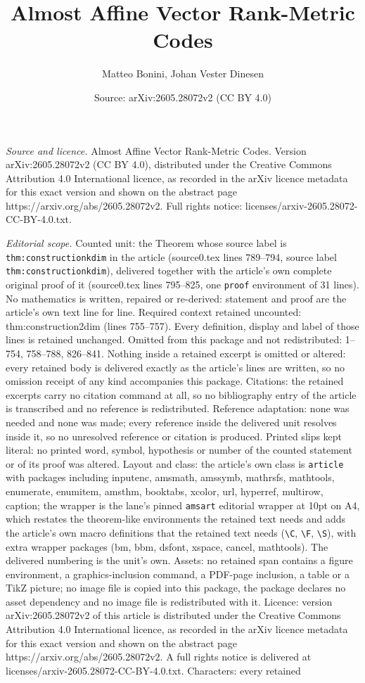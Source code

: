 \documentclass[10pt,a4paper]{amsart}
\title[Almost Affine Vector Rank-Metric Codes]{Almost Affine Vector Rank-Metric Codes}
\author{Matteo Bonini, Johan Vester Dinesen}
\date{Source: arXiv:2605.28072v2 (CC BY 4.0)}
\begin{document}
\maketitle

\noindent\emph{Source and licence.} Almost Affine Vector Rank-Metric Codes. Version arXiv:2605.28072v2 (CC BY 4.0), distributed under the Creative Commons Attribution 4.0 International licence, as recorded in the arXiv licence metadata for this exact version and shown on the abstract page https://arxiv.org/abs/2605.28072v2. Full rights notice: licenses/arxiv-2605.28072-CC-BY-4.0.txt.\par\smallskip

\noindent\textit{Editorial scope.} Counted unit: the Theorem whose source label is \texttt{thm:constructionkdim} in the article (source0.tex lines 789--794, source label \texttt{thm:constructionkdim}), delivered together with the article's own complete original proof of it (source0.tex lines 795--825, one \texttt{proof} environment of 31 lines). No mathematics is written, repaired or re-derived: statement and proof are the article's own text line for line. Required context retained uncounted: thm:construction2dim (lines 755--757). Every definition, display and label of those lines is retained unchanged. Omitted from this package and not redistributed: 1--754, 758--788, 826--841. Nothing inside a retained excerpt is omitted or altered: every retained body is delivered exactly as the article's lines are written, so no omission receipt of any kind accompanies this package. Citations: the retained excerpts carry no citation command at all, so no bibliography entry of the article is transcribed and no reference is redistributed. Reference adaptation: none was needed and none was made; every reference inside the delivered unit resolves inside it, so no unresolved reference or citation is produced. Printed slips kept literal: no printed word, symbol, hypothesis or number of the counted statement or of its proof was altered. Layout and class: the article's own class is \texttt{article} with packages including inputenc, amsmath, amssymb, mathrsfs, mathtools, enumerate, enumitem, amsthm, booktabs, xcolor, url, hyperref, multirow, caption; the wrapper is the lane's pinned \texttt{amsart} editorial wrapper at 10pt on A4, which restates the theorem-like environments the retained text needs and adds the article's own macro definitions that the retained text needs (\texttt{\textbackslash C}, \texttt{\textbackslash F}, \texttt{\textbackslash S}), with extra wrapper packages (bm, bbm, dsfont, xspace, cancel, mathtools). The delivered numbering is the unit's own. Assets: no retained span contains a figure environment, a graphics-inclusion command, a PDF-page inclusion, a table or a TikZ picture; no image file is copied into this package, the package declares no asset dependency and no image file is redistributed with it. Licence: version arXiv:2605.28072v2 of this article is distributed under the Creative Commons Attribution 4.0 International licence, as recorded in the arXiv licence metadata for this exact version and shown on the abstract page https://arxiv.org/abs/2605.28072v2. A full rights notice is delivered at licenses/arxiv-2605.28072-CC-BY-4.0.txt. Characters: every retained 
\end{document}
